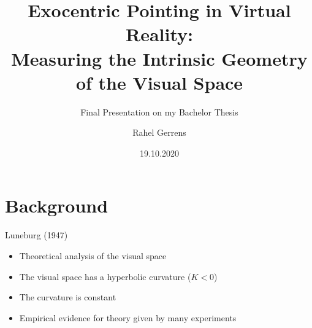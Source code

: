 \documentclass{beamer}
\title[Exocentric Pointing in Virtual Reality]{Exocentric Pointing in Virtual Reality:\\ Measuring the Intrinsic Geometry of the Visual Space} %
\subtitle{Final Presentation on my Bachelor Thesis} %
\author{Rahel Gerrens} %
\date{19.10.2020} %
\begin{document}
\begin{frame}
\titlepage %
\end{frame}


\section{Background}

\begin{frame}{Luneburg (1947)}
    \begin{itemize}
        \item Theoretical analysis of the visual space 
        \item The visual space has a hyperbolic curvature ($K< 0$)
        \item The curvature is constant
        \item Empirical evidence for theory given by many experiments
    \end{itemize}
\end{frame}
\end{document}
